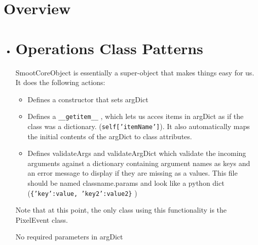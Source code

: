 \documentclass{article}
\begin{document}
    \section{Overview}
        \begin{itemize}
            \item
    \section{Operations Class Patterns}
    {SmootCoreObject is essentially a super-object
            that makes things easy for us.  It does the following actions:
                \begin{itemize}
                    \item Defines a constructor that sets argDict
                    \item Defines a \texttt{\_\_getitem\_\_} , which lets us acces items in
                    argDict as if the class was a dictionary.
                    (\texttt{self['itemName']}).  It also automatically maps the
                    initial contents of the argDict to class attributes.
                    \item Defines validateArgs and validateArgDict which
                    validate the incoming arguments against a dictionary
                    containing argument names as keys and an error message to
                    display if they are missing as a values.  This file should
                    be named classname.params and look like a python dict
                    (\texttt{\{'key':value, 'key2':value2\}} )
                \end{itemize}
            Note that at this point, the only class using this functionality
                is the PixelEvent class.}
            {No required parameters in argDict}
\end{itemize}
\end{document}
